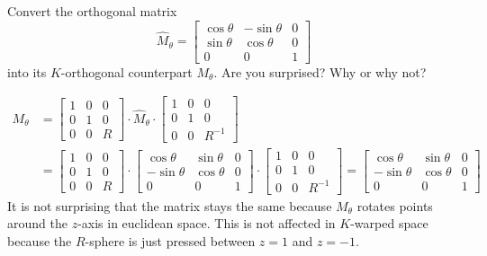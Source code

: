 \documentclass[newpage,hints,handout]{ximera}
\begin{document}
\begin{problem}
  Convert the orthogonal matrix
  \[
  \hat{M}_\theta=\begin{bmatrix}
  \cos\theta & -\sin\theta & 0\\
  \sin\theta & \cos\theta & 0\\
  0 & 0 & 1
  \end{bmatrix}
  \]
  into its $K$-orthogonal counterpart $M_\theta$. Are you surprised? Why or why
  not?
  
\begin{freeResponse}
\begin{align*}
M_\theta &= \begin{bmatrix}
1 & 0 & 0\\
0 & 1 & 0\\
0 & 0 & R%
\end{bmatrix} \cdot \hat{M}_\theta \cdot
\begin{bmatrix}
1 & 0 & 0\\
0 & 1 & 0\\
0 & 0 & R^{-1}%
\end{bmatrix} \\
&= \begin{bmatrix}
1 & 0 & 0\\
0 & 1 & 0\\
0 & 0 & R%
\end{bmatrix} \cdot 
\begin{bmatrix}
  \cos\theta & \sin\theta & 0\\
  -\sin\theta & \cos\theta & 0\\
  0 & 0 & 1
  \end{bmatrix} \cdot
\begin{bmatrix}
1 & 0 & 0\\
0 & 1 & 0\\
0 & 0 & R^{-1}%
\end{bmatrix}
= \begin{bmatrix}
  \cos\theta & \sin\theta & 0\\
  -\sin\theta & \cos\theta & 0\\
  0 & 0 & 1
  \end{bmatrix} 
\end{align*} 
It is not surprising that the matrix stays the same because $M_\theta$ rotates points around the $z$-axis in euclidean space. This is not affected in $K$-warped space because the $R$-sphere is just pressed between $z=1$ and $z=-1$.
\end{freeResponse}

\end{problem}
\end{document}
